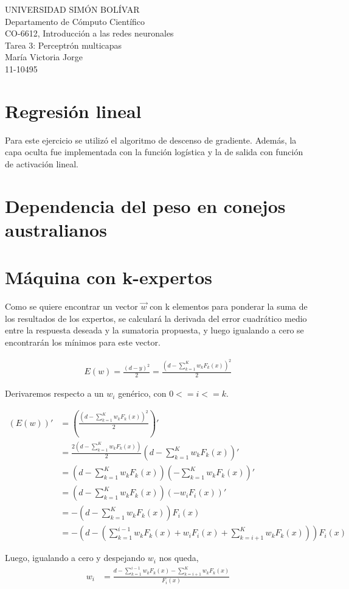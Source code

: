 \documentclass[a4paper]{article}
\begin{document}
\noindent UNIVERSIDAD SIMÓN BOLÍVAR\\
Departamento de Cómputo Científico\\
CO-6612, Introducción a las redes neuronales\\
Tarea 3: Perceptrón multicapas\\
María Victoria Jorge\\
11-10495

\section{Regresión lineal}
Para este ejercicio se utilizó el algoritmo de descenso de gradiente. Además, la capa oculta fue implementada con la función logística y la de salida con función de activación lineal.


\section{Dependencia del peso en conejos australianos}
\section{Máquina con k-expertos}
Como se quiere encontrar un vector $\vec{w}$ con k elementos para ponderar la suma de los resultados de los expertos, se calculará la derivada del error cuadrático medio entre la respuesta deseada y la sumatoria propuesta, y luego igualando a cero se encontrarán los mínimos para este vector.

\begin{align*}
E(w) = \frac{(d - y)^{2}}{2} = \frac{(d - \sum_{k=1}^{K}w_{k}F_{k}(x) )^{2} }{2}
\end{align*}

Derivaremos respecto a un $w_{i}$ genérico, con $0 <= i <= k$.

\begin{align*}
(E(w))' &= (\frac{(d - \sum_{k=1}^{K}w_{k}F_{k}(x) )^{2} }{2})'\\
	    &= \frac{2(d - \sum_{k=1}^{K}w_{k}F_{k}(x) ) }{2}(d - \sum_{k=1}^{K}w_{k}F_{k}(x))'	 \\
	    &= (d - \sum_{k=1}^{K}w_{k}F_{k}(x) )(-\sum_{k=1}^{K}w_{k}F_{k}(x))' \\
	    &= (d - \sum_{k=1}^{K}w_{k}F_{k}(x) )(-w_{i}F_{i}(x))'  \\
	    &= -(d - \sum_{k=1}^{K}w_{k}F_{k}(x) )F_{i}(x)\\
	    &= -(d - (\sum_{k=1}^{i-1}w_{k}F_{k}(x) + w_{i}F_{i}(x) + \sum_{k=i+1}^{K}w_{k}F_{k}(x) ) )F_{i}(x)
\end{align*}

Luego, igualando a cero y despejando $w_{i}$ nos queda,
\begin{align*}
w_{i} &= \frac{d - \sum_{k=1}^{i-1}w_{k}F_{k}(x) - \sum_{k=i+1}^{K}w_{k}F_{k}(x)}{F_{i}(x)}
\end{align*}
\end{document}
